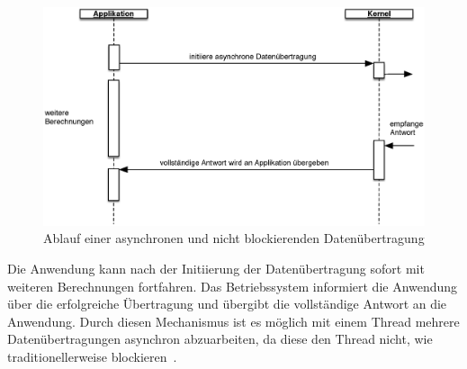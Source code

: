 \begin{figure}[H]
 \centering
 \includegraphics[width=1.0\textwidth]{4-Hauptteil/async-io/async-io.eps}
 \caption{Ablauf einer asynchronen und nicht blockierenden Datenübertragung}
 \label{fig:async-io}
\end{figure}

Die Anwendung kann nach der Initiierung der Datenübertragung sofort mit weiteren Berechnungen fortfahren. Das Betriebssystem informiert die Anwendung über die erfolgreiche Übertragung und übergibt die vollständige Antwort an die Anwendung. Durch diesen Mechanismus ist es möglich mit einem Thread mehrere Datenübertragungen asynchron abzuarbeiten, da diese den Thread nicht, wie traditionellerweise blockieren~\cite{jones_boost_2006}.

\pagebreak

